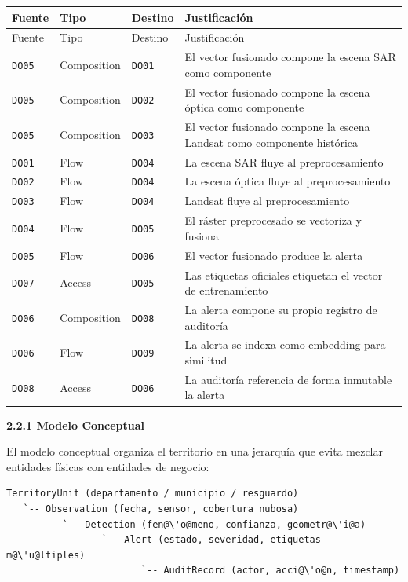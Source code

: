 \documentclass{article}
\newcommand{\mdhfour}[1]{\par\medskip\noindent\textbf{#1}\par\nobreak\smallskip}
\begin{document}
{\small
\begin{longtable}{@{}L{0.45in}L{0.82in}L{0.53in}L{4.14in}@{}}
\toprule
Fuente & Tipo & Destino & Justificación \\
\midrule
\endfirsthead
\toprule
Fuente & Tipo & Destino & Justificación \\
\midrule
\endhead
\bottomrule
\endlastfoot
\texttt{DO05} & Composition & \texttt{DO01} & El vector fusionado compone la escena SAR como componente \\
\texttt{DO05} & Composition & \texttt{DO02} & El vector fusionado compone la escena óptica como componente \\
\texttt{DO05} & Composition & \texttt{DO03} & El vector fusionado compone la escena Landsat como componente histórica \\
\texttt{DO01} & Flow & \texttt{DO04} & La escena SAR fluye al preprocesamiento \\
\texttt{DO02} & Flow & \texttt{DO04} & La escena óptica fluye al preprocesamiento \\
\texttt{DO03} & Flow & \texttt{DO04} & Landsat fluye al preprocesamiento \\
\texttt{DO04} & Flow & \texttt{DO05} & El ráster preprocesado se vectoriza y fusiona \\
\texttt{DO05} & Flow & \texttt{DO06} & El vector fusionado produce la alerta \\
\texttt{DO07} & Access & \texttt{DO05} & Las etiquetas oficiales etiquetan el vector de entrenamiento \\
\texttt{DO06} & Composition & \texttt{DO08} & La alerta compone su propio registro de auditoría \\
\texttt{DO06} & Flow & \texttt{DO09} & La alerta se indexa como embedding para similitud \\
\texttt{DO08} & Access & \texttt{DO06} & La auditoría referencia de forma inmutable la alerta \\
\end{longtable}
}

\mdhfour{2.2.1 Modelo Conceptual}

El modelo conceptual organiza el territorio en una jerarquía que evita mezclar entidades físicas con entidades de negocio:

\begin{lstlisting}
TerritoryUnit (departamento / municipio / resguardo)
   `-- Observation (fecha, sensor, cobertura nubosa)
          `-- Detection (fen@\'o@meno, confianza, geometr@\'i@a)
                 `-- Alert (estado, severidad, etiquetas m@\'u@ltiples)
                        `-- AuditRecord (actor, acci@\'o@n, timestamp)
\end{lstlisting}
\end{document}
